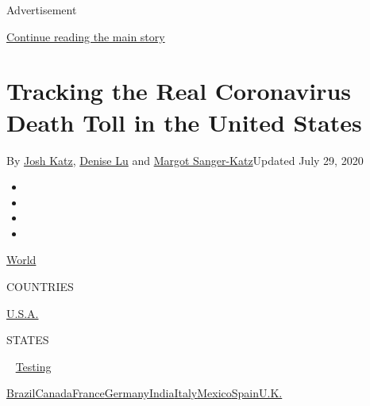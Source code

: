 Advertisement

\protect\hyperlink{after-top}{Continue reading the main story}

\hypertarget{tracking-the-real-coronavirus-death-toll-in-the-united-states}{%
\section{Tracking the Real Coronavirus Death Toll in the United
States}\label{tracking-the-real-coronavirus-death-toll-in-the-united-states}}

By \href{https://www.nytimes3xbfgragh.onion/by/josh-katz}{Josh Katz},
\href{https://www.nytimes3xbfgragh.onion/by/denise-lu}{Denise Lu} and
\href{https://www.nytimes3xbfgragh.onion/by/margot-sanger-katz}{Margot
Sanger-Katz}Updated July 29, 2020

\begin{itemize}
\item
\item
\item
\item
\end{itemize}

\href{https://www.nytimes3xbfgragh.onion/interactive/2020/world/coronavirus-maps.html}{World}~

COUNTRIES

\textbar{}
\href{https://www.nytimes3xbfgragh.onion/interactive/2020/us/coronavirus-us-cases.html}{U.S.A.}~

STATES

~
\href{https://www.nytimes3xbfgragh.onion/interactive/2020/us/coronavirus-testing.html}{Testing}

\href{https://www.nytimes3xbfgragh.onion/interactive/2020/world/americas/brazil-coronavirus-cases.html}{Brazil}\href{https://www.nytimes3xbfgragh.onion/interactive/2020/world/canada/canada-coronavirus-cases.html}{Canada}\href{https://www.nytimes3xbfgragh.onion/interactive/2020/world/europe/france-coronavirus-cases.html}{France}\href{https://www.nytimes3xbfgragh.onion/interactive/2020/world/europe/germany-coronavirus-cases.html}{Germany}\href{https://www.nytimes3xbfgragh.onion/interactive/2020/world/asia/india-coronavirus-cases.html}{India}\href{https://www.nytimes3xbfgragh.onion/interactive/2020/world/europe/italy-coronavirus-cases.html}{Italy}\href{https://www.nytimes3xbfgragh.onion/interactive/2020/world/americas/mexico-coronavirus-cases.html}{Mexico}\href{https://www.nytimes3xbfgragh.onion/interactive/2020/world/europe/spain-coronavirus-cases.html}{Spain}\href{https://www.nytimes3xbfgragh.onion/interactive/2020/world/europe/united-kingdom-coronavirus-cases.html}{U.K.}

